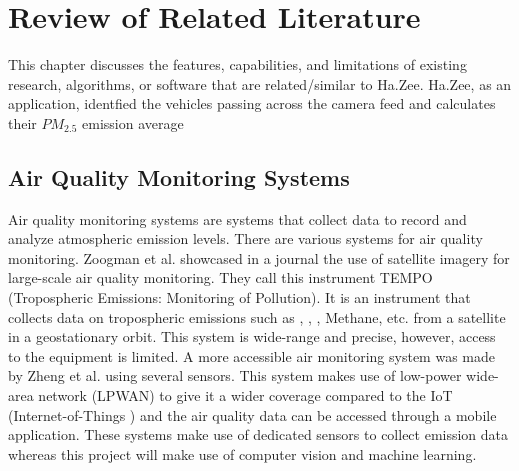 \chapter{Review of Related Literature}
\label{sec:relatedlit}

This chapter discusses the features, capabilities, and limitations of existing research, algorithms, or software  that are related/similar to Ha.Zee. Ha.Zee, as an application, identfied the vehicles passing across the camera feed and calculates their $PM_{2.5}$ emission average


\begin{comment}
%
%
Guide on Writing your RRL chapter
 
1. Identify the keywords with respect to your research
      One keyword = One document section
                Examples: 2.1 Story Generation Systems
			 2.2 Knowledge Representation

2.  Find references using these keywords

3.  For each of the references that you find,
        Check: Is it relevant to your research?
        Use their references to find more relevant works.

4. Identify a set of criteria for comparison.
       It will serve as a guide to help you focus on what to look for

5. Write a summary focusing on -
       What: A short description of the work
       How: A summary of the approach it utilized
       Findings: If applicable, provide the results
        Why: Relevance to your work

6. At the end of each section,  show a Table of Comparison of the related works 
   and your proposed project/system

\end{comment}

\section{Air Quality Monitoring Systems}
Air quality monitoring systems are systems that collect data to record and analyze atmospheric emission levels. There are various systems for air quality monitoring. Zoogman et al.\citeyear{zoogman_2017} showcased in a journal the use of satellite imagery for large-scale air quality monitoring. They call this instrument TEMPO (Tropospheric Emissions: Monitoring of Pollution). It is an instrument that collects data on tropospheric emissions such as , , , Methane, etc. from a satellite in a geostationary orbit. This system is wide-range and precise,  however, access to the equipment is limited.  A more accessible air monitoring system was made by Zheng et al. \citeyear{zheng_2016} using several sensors. This system makes use of low-power wide-area network (LPWAN) to give it a wider coverage compared to the IoT (Internet-of-Things ) and the air quality data can be accessed through a mobile application. These systems make use of dedicated sensors to collect emission data whereas this project will make use of computer vision and machine learning.


